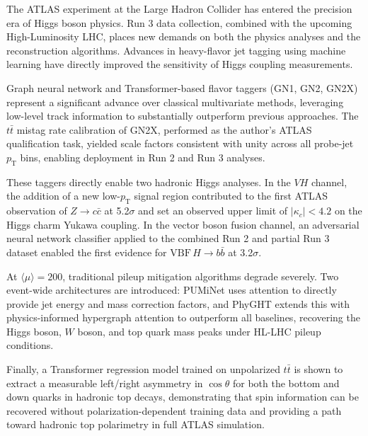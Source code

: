 The ATLAS experiment at the Large Hadron Collider has entered the precision era of Higgs boson physics. Run 3 data collection, combined with the upcoming High-Luminosity LHC, places new demands on both the physics analyses and the reconstruction algorithms. Advances in heavy-flavor jet tagging using machine learning have directly improved the sensitivity of Higgs coupling measurements.
\par
Graph neural network and Transformer-based flavor taggers (GN1, GN2, GN2X) represent a significant advance over classical multivariate methods, leveraging low-level track information to substantially outperform previous approaches. The $t\bar{t}$ mistag rate calibration of GN2X, performed as the author's ATLAS qualification task, yielded scale factors consistent with unity across all probe-jet $p_\mathrm{T}$ bins, enabling deployment in Run 2 and Run 3 analyses.
\par
These taggers directly enable two hadronic Higgs analyses. In the $VH$ channel, the addition of a new low-$p_\mathrm{T}$ signal region contributed to the first ATLAS observation of $Z \rightarrow c\bar{c}$ at 5.2$\sigma$ and set an observed upper limit of $|\kappa_c| < 4.2$ on the Higgs charm Yukawa coupling. In the vector boson fusion channel, an adversarial neural network classifier applied to the combined Run 2 and partial Run 3 dataset enabled the first evidence for $\mathrm{VBF}\,H \rightarrow b\bar{b}$ at 3.2$\sigma$.
\par
At $\langle\mu\rangle = 200$, traditional pileup mitigation algorithms degrade severely. Two event-wide architectures are introduced: PUMiNet uses attention to directly provide jet energy and mass correction factors, and PhyGHT extends this with physics-informed hypergraph attention to outperform all baselines, recovering the Higgs boson, $W$ boson, and top quark mass peaks under HL-LHC pileup conditions.
\par
Finally, a Transformer regression model trained on unpolarized $t\bar{t}$ is shown to extract a measurable left/right asymmetry in $\cos\theta$ for both the bottom and down quarks in hadronic top decays, demonstrating that spin information can be recovered without polarization-dependent training data and providing a path toward hadronic top polarimetry in full ATLAS simulation.
